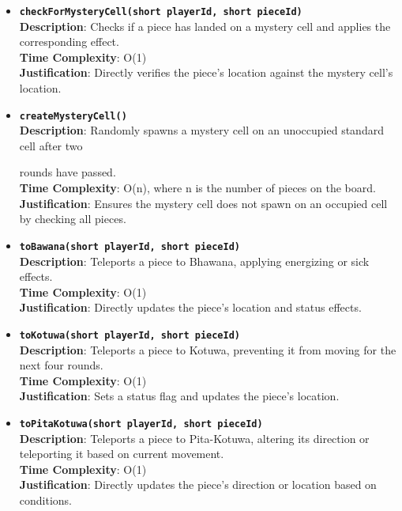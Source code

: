\documentclass{article}
\begin{document}
        \begin{itemize}
            \item \textbf{\texttt{checkForMysteryCell(short playerId, short pieceId)}}\\
            \textbf{Description}: Checks if a piece has landed on a mystery cell and applies the corresponding effect.\\
            \textbf{Time Complexity}: O(1)\\
            \textbf{Justification}: Directly verifies the piece’s location against the mystery cell’s location.
            
            \item \textbf{\texttt{createMysteryCell()}}\\
            \textbf{Description}: Randomly spawns a mystery cell on an unoccupied standard cell after two
        
         rounds have passed.\\
            \textbf{Time Complexity}: O(n), where n is the number of pieces on the board.\\
            \textbf{Justification}: Ensures the mystery cell does not spawn on an occupied cell by checking all pieces.
            
            \item \textbf{\texttt{toBawana(short playerId, short pieceId)}}\\
            \textbf{Description}: Teleports a piece to Bhawana, applying energizing or sick effects.\\
            \textbf{Time Complexity}: O(1)\\
            \textbf{Justification}: Directly updates the piece’s location and status effects.
            
            \item \textbf{\texttt{toKotuwa(short playerId, short pieceId)}}\\
            \textbf{Description}: Teleports a piece to Kotuwa, preventing it from moving for the next four rounds.\\
            \textbf{Time Complexity}: O(1)\\
            \textbf{Justification}: Sets a status flag and updates the piece’s location.
            
            \item \textbf{\texttt{toPitaKotuwa(short playerId, short pieceId)}}\\
            \textbf{Description}: Teleports a piece to Pita-Kotuwa, altering its direction or teleporting it based on current movement.\\
            \textbf{Time Complexity}: O(1)\\
            \textbf{Justification}: Directly updates the piece’s direction or location based on conditions.
            

\end{itemize}
\end{document}
